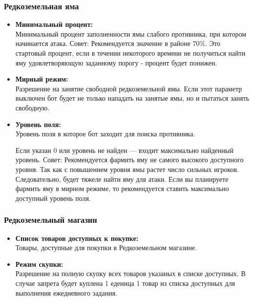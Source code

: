 \documentclass[
]{article}
\begin{document}
\subsubsection{Редкоземельная
яма}\label{ux440ux435ux434ux43aux43eux437ux435ux43cux435ux43bux44cux43dux430ux44f-ux44fux43cux430-1}

\begin{itemize}
\item
  \textbf{Минимальный процент:}\\
  Минимальный процент заполненности ямы слабого противника, при котором
  начинается атака. Совет: Рекомендуется значение в районе 70\%. Это
  стартовый процент, если в течении некоторого времени не получиться
  найти яму удовлетворяющую заданному порогу - процент будет понижен.
\item
  \textbf{Мирный режим:}\\
  Разрешение на занятие свободной редкоземельной ямы. Если этот параметр
  выключен бот будет не только нападать на занятые ямы, но и пытаться
  занять свободную.
\item
  \textbf{Уровень поля:}\\
  Уровень поля в которое бот заходит для поиска противника.

  Если указан 0 или уровень не найден — входит максимально найденный
  уровень. Совет: Рекомендуется фармить яму не самого высокого
  доступного уровня. Так как с повышением уровня ямы растет число
  сильных игроков. Следовательно, будет тяжеле найти яму для атаки. Если
  вы планируете фармить яму в мирном режиме, то рекомендуется ставить
  максимально доступный уровень поля.
\end{itemize}

\subsubsection{Редкоземельный
магазин}\label{ux440ux435ux434ux43aux43eux437ux435ux43cux435ux43bux44cux43dux44bux439-ux43cux430ux433ux430ux437ux438ux43d}

\begin{itemize}
\item
  \textbf{Список товаров доступных к покупке:}\\
  Товары, доступные для покупки в Редкоземельном магазине.
\item
  \textbf{Режим скупки:}\\
  Разрешение на полную скупку всех товаров указаных в списке доступных.
  В случае запрета будет куплена 1 еденица 1 товар из списка доступных
  для выполнения ежедневного задания.
\end{itemize}
\end{document}
